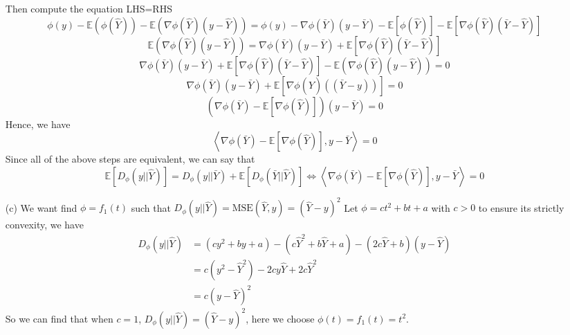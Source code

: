 \documentclass[12pt,a4paper]{article}
\begin{document}
\begin{enumerate}
\begin{equation*}
        \end{equation*}
        Then compute the equation LHS=RHS
        \begin{equation*}
            \phi(y) - \mathbb{E} (\phi(\hat{Y})) - \mathbb{E} (\nabla\phi(\hat{Y})(y-\hat{Y})) = \phi(y) - \nabla\phi(\bar{Y})(y-\bar{Y}) - \mathbb{E}[\phi(\hat{Y})] - \mathbb{E}[\nabla\phi(\hat{Y})(\bar{Y}-\hat{Y})]
        \end{equation*}
        \begin{equation*}
            \mathbb{E} (\nabla\phi(\hat{Y})(y-\hat{Y})) = \nabla\phi(\bar{Y})(y-\bar{Y}) + \mathbb{E}[\nabla\phi(\hat{Y})(\bar{Y}-\hat{Y})]
        \end{equation*}
        \begin{equation*}
            \nabla\phi(\bar{Y})(y-\bar{Y}) + \mathbb{E}[\nabla\phi(\hat{Y})(\bar{Y}-\hat{Y})] - \mathbb{E} (\nabla\phi(\hat{Y})(y-\hat{Y})) = 0
        \end{equation*}
        \begin{equation*}
            \nabla\phi(\bar{Y})(y-\bar{Y}) + \mathbb{E}[\nabla\phi(\hat{Y})((\bar{Y}-y))] = 0
        \end{equation*}
        \begin{equation*}
            (\nabla\phi(\bar{Y}) - \mathbb{E}[\nabla\phi(\hat{Y})])(y-\bar{Y}) = 0
        \end{equation*}
        Hence, we have
        \begin{equation*}
            \left\langle \nabla\phi(\bar{Y}) - \mathbb{E}[\nabla\phi(\hat{Y})], y-\bar{Y} \right\rangle = 0
        \end{equation*}
        Since all of the above steps are equivalent, we can say that
        \begin{equation*}
            \mathbb{E}[D_{\phi}(y||\hat{Y})] = D_{\phi}(y||\bar{Y}) + \mathbb{E}[D_{\phi}(\bar{Y}||\hat{Y})]\Leftrightarrow \left\langle \nabla\phi(\bar{Y}) - \mathbb{E}[\nabla\phi(\hat{Y})], y-\bar{Y} \right\rangle = 0
        \end{equation*}
    \item[(c)]
        We want find $\phi=f_{1}(t)$ such that $D_{\phi}(y||\hat{Y}) = \text{MSE}(\hat{Y}, y) = (\hat{Y}-y)^{2}$
        Let $\phi = ct^2+bt+a$ with $c>0$ to ensure its strictly convexity, we have
        \begin{equation*}
            \begin{split}
                D_{\phi}(y||\hat{Y}) 
                    &= (cy^2 + by + a) - (c\hat{Y}^2+b\hat{Y}+a) - (2c\hat{Y}+b)(y-\hat{Y}) \\
                    &= c(y^2-\hat{Y}^{2}) - 2cy\hat{Y} + 2c\hat{Y}^2\\
                    &= c(y-\hat{Y})^{2}
            \end{split}
        \end{equation*}
        So we can find that when $c = 1$, $D_{\phi}(y||\hat{Y}) = (\hat{Y}-y)^{2}$, here we choose $\phi(t) = f_{1}(t) = t^{2}$.


\end{enumerate}
\end{document}
